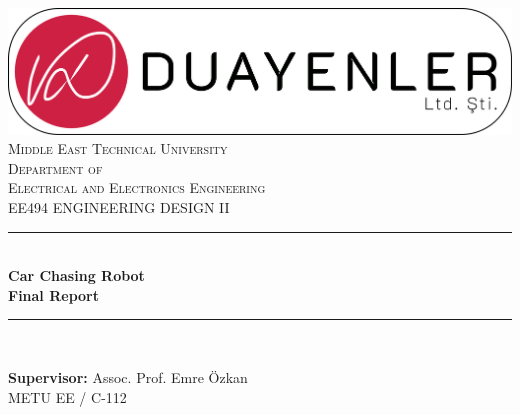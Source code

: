 \documentclass[a4paper,12pt]{article}
\begin{document}
\begin{titlepage}


\newcommand{\HRule}{\rule{\linewidth}{0.5mm}} %

\centering 


\includegraphics[width=\textwidth,height=\textheight,keepaspectratio]{../../documents/logos/logo3-with-stroke}\\[0.5cm]


\textsc{\LARGE Middle East Technical University}\\[0.5cm] %

\textsc{\Large Department of \\Electrical and Electronics Engineering }\\[0.5cm] %

\textsc{\large EE494 ENGINEERING DESIGN II}\\[0.5cm] %



\HRule \\[0cm]

{ \huge \bfseries  Car Chasing Robot\\[0.1cm] \LARGE \bfseries Final Report}\\[0cm] %

\HRule \\[1cm]


\begin{minipage}[l]{0.6\textwidth}

\raggedright

\large{\textbf{Supervisor:}}	Assoc. Prof. Emre Özkan \\

\hspace{3.05cm}  METU EE / C-112


\end{minipage}

\begin{minipage}[r]{0.35\textwidth}

\raggedright


\end{minipage}
\end{titlepage}
\end{document}
